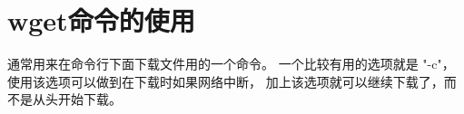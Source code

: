 \section{wget命令的使用}
\label{sec:wgetCmd}

通常用来在命令行下面下载文件用的一个命令。
一个比较有用的选项就是 "-c"，使用该选项可以做到在下载时如果网络中断，
加上该选项就可以继续下载了，而不是从头开始下载。
